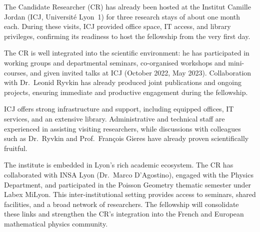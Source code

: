 \documentclass[11pt]{msca-pf}
\begin{document}
The Candidate Researcher (CR) has already been hosted at the Institut Camille Jordan (ICJ, Université Lyon~1) for three research stays of about one month each. During these visits, ICJ provided office space, IT access, and library privileges, confirming its readiness to host the fellowship from the very first day.  

The CR is well integrated into the scientific environment: he has participated in working groups and departmental seminars, co-organised workshops and mini-courses, and given invited talks at ICJ (October 2022, May 2023). Collaboration with Dr.~Leonid Ryvkin has already produced joint publications and ongoing projects, ensuring immediate and productive engagement during the fellowship.  

ICJ offers strong infrastructure and support, including equipped offices, IT services, and an extensive library. Administrative and technical staff are experienced in assisting visiting researchers, while discussions with colleagues such as Dr.~Ryvkin and Prof.~François Gieres have already proven scientifically fruitful.  

The institute is embedded in Lyon’s rich academic ecosystem. The CR has collaborated with INSA Lyon (Dr.~Marco D’Agostino), engaged with the Physics Department, and participated in the Poisson Geometry thematic semester under Labex MiLyon. This inter-institutional setting provides access to seminars, shared facilities, and a broad network of researchers. The fellowship will consolidate these links and strengthen the CR’s integration into the French and European mathematical physics community.  










\footnotesize

%



\end{document}
